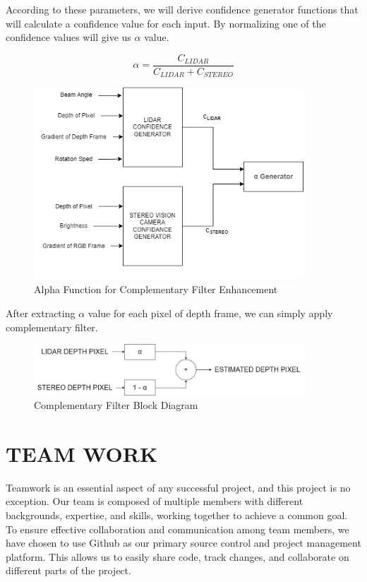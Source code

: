 \documentclass[12pt]{article}
\begin{document}
According to these parameters, we will derive confidence generator functions that will calculate a confidence value for each input. By normalizing one of the confidence values will give us $\alpha$ value.

\begin{equation}
    \alpha = \frac{C_{LIDAR}}{C_{LIDAR} + C_{STEREO}}
\end{equation}

\begin{figure}[H]
    \centering
    \includegraphics[width=0.9\textwidth]{AlphaFunction.jpeg}
    \caption{Alpha Function for Complementary Filter Enhancement}
\end{figure}

After extracting $\alpha$ value for each pixel of depth frame, we can simply apply complementary filter.

\begin{figure}[H]
    \centering
    \includegraphics[width=0.9\textwidth]{CompFiltBD.jpeg}
    \caption{Complementary Filter Block Diagram}
\end{figure}

\section{TEAM WORK}

Teamwork is an essential aspect of any successful project, and this project is no exception. Our team is composed of multiple members with different backgrounds, expertise, and skills, working together to achieve a common goal. To ensure effective collaboration and communication among team members, we have chosen to use Github as our primary source control and project management platform. This allows us to easily share code, track changes, and collaborate on different parts of the project.
\end{document}
